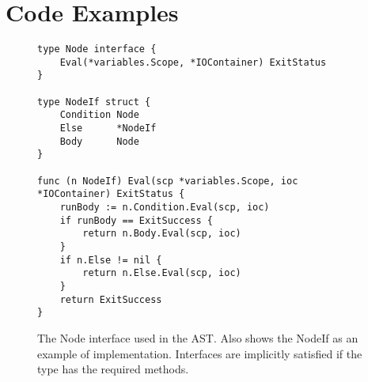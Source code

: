 \chapter{Code Examples}

\begin{figure}[hp]
\label{code:node-interface}
\begin{lstlisting}[frame=tb]
type Node interface {
	Eval(*variables.Scope, *IOContainer) ExitStatus
}

type NodeIf struct {
	Condition Node
	Else      *NodeIf
	Body      Node
}

func (n NodeIf) Eval(scp *variables.Scope, ioc *IOContainer) ExitStatus {
	runBody := n.Condition.Eval(scp, ioc)
	if runBody == ExitSuccess {
		return n.Body.Eval(scp, ioc)
	}
	if n.Else != nil {
		return n.Else.Eval(scp, ioc)
	}
	return ExitSuccess
}     
\end{lstlisting}
\caption[The Node Interface]{The Node interface used in the AST. Also shows the NodeIf as an example of implementation. Interfaces are implicitly satisfied if the type has the required methods.}
\end{figure}